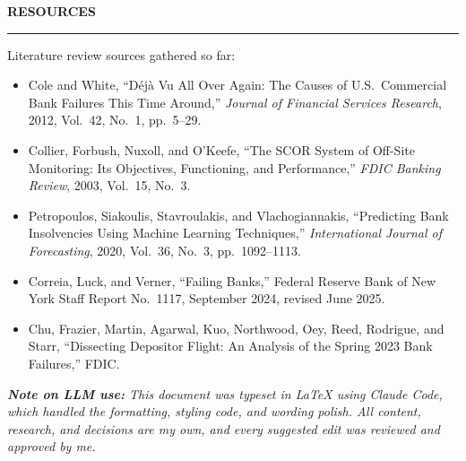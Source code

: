 \documentclass[11pt,letterpaper]{article}
\newcommand{\sectionhead}[1]{%
  \vspace{6pt}%
  {\sffamily\bfseries\fontsize{9.5}{12}\selectfont\color{navy}\MakeUppercase{#1}}\par
  \vspace{-9pt}\textcolor{hairline}{\rule{\textwidth}{0.5pt}}\par\vspace{0pt}}
\newcommand{\answer}[1]{#1\par\vspace{3pt}}
\begin{document}
\sectionhead{Resources}
\answer{Literature review sources gathered so far:
\begin{itemize}[topsep=1pt,itemsep=1pt,leftmargin=14pt,label=\textcolor{navy}{\footnotesize\textbullet}]
  \item Cole and White, ``D\'{e}j\`{a} Vu All Over Again: The Causes of U.S.\ Commercial Bank Failures This Time Around,'' \textit{Journal of Financial Services Research}, 2012, Vol.\ 42, No.\ 1, pp.\ 5--29.
  \item Collier, Forbush, Nuxoll, and O'Keefe, ``The SCOR System of Off-Site Monitoring: Its Objectives, Functioning, and Performance,'' \textit{FDIC Banking Review}, 2003, Vol.\ 15, No.\ 3.
  \item Petropoulos, Siakoulis, Stavroulakis, and Vlachogiannakis, ``Predicting Bank Insolvencies Using Machine Learning Techniques,'' \textit{International Journal of Forecasting}, 2020, Vol.\ 36, No.\ 3, pp.\ 1092--1113.
  \item Correia, Luck, and Verner, ``Failing Banks,'' Federal Reserve Bank of New York Staff Report No.\ 1117, September 2024, revised June 2025.
  \item Chu, Frazier, Martin, Agarwal, Kuo, Northwood, Oey, Reed, Rodrigue, and Starr, ``Dissecting Depositor Flight: An Analysis of the Spring 2023 Bank Failures,'' FDIC.
\end{itemize}}

\vspace{2pt}
{\small\itshape\color{midgray}\textbf{Note on LLM use:} This document was typeset in LaTeX using Claude Code, which handled the formatting, styling code, and wording polish. All content, research, and decisions are my own, and every suggested edit was reviewed and approved by me.}
\end{document}
